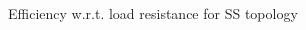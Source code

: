 
\begin{figure}[h]
\centering
\begin{subfigmatrix}{2} 
\end{subfigmatrix}
\end{figure}
\begin{figure}[H]
\centering
\begin{subfigmatrix}{1} 
\end{subfigmatrix}
\caption{Efficiency w.r.t. load resistance for SS topology}
\end{figure}

